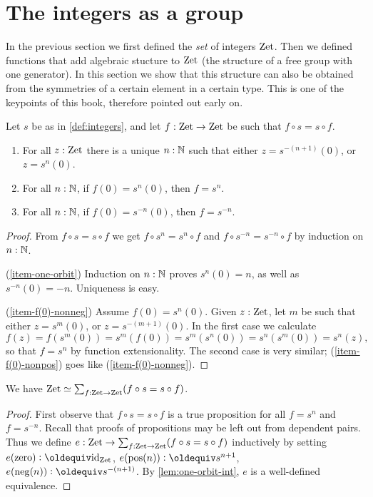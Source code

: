 \documentclass[a4,12pt]{amsart}
\begin{document}
\section{The integers as a group}
\label{sec:integers-group}

In the previous section we first defined the \emph{set}
of integers $\mathrm{Zet}$. Then we defined functions that add
algebraic stucture to $\mathrm{Zet}$ (the structure of a free group 
with one generator). In this section we
show that this structure can also be obtained from the
symmetries of a certain element in a certain type.
This is one of the keypoints of this book, 
therefore pointed out early on.

\begin{lemma}\label{lem:one-orbit-int}
Let $s$ be as in \cref{def:integers}, and 
let $f:\mathrm{Zet}\to\mathrm{Zet}$ be such that $f\circ s = s\circ f$. 
  \begin{enumerate}
  \item\label{item-one-orbit} For all $z:\mathrm{Zet}$ there is a unique $n:\mathbb{N}$
such that either $z=s^{-(n+1)}(0)$, or $z=s^{n}(0)$.
  \item\label{item-f(0)-nonneg} For all $n:\mathbb{N}$, if $f(0)=s^{n}(0)$, then $f=s^{n}$.
  \item\label{item-f(0)-nonpos} For all $n:\mathbb{N}$, if $f(0)=s^{-n}(0)$, then $f=s^{-n}$.
  \end{enumerate}
\end{lemma}
\begin{proof}
From $f\circ s = s\circ f$ we get $f\circ s^n = s^n\circ f$
and $f\circ s^{-n} = s^{-n}\circ f$ by induction on $n:\mathbb{N}$.

(\ref{item-one-orbit}) Induction on $n:\mathbb{N}$ proves $s^{n}(0)=n$, 
as well as $s^{-n}(0)=-n$. Uniqueness is easy.

(\ref{item-f(0)-nonneg}) Assume $f(0)=s^{n}(0)$.  
Given $z:\mathrm{Zet}$, let $m$ be such that either $z=s^{m}(0)$, 
or $z=s^{-(m+1)}(0)$. In the first case we calculate
\[
f(z)=f(s^{m}(0))=s^{m}(f(0))=s^{m}(s^{n}(0))=s^{n}(s^{m}(0))= s^{n}(z),
\]
so that $f=s^{n}$ by function extensionality. 
The second case is very similar;
(\ref{item-f(0)-nonpos}) goes like (\ref{item-f(0)-nonneg}).
\end{proof}

\begin{corollary}\label{cor:pre-torsor-int}
We have $\mathrm{Zet}\simeq \sum_{f:\mathrm{Zet}\to\mathrm{Zet}} (f\circ s = s\circ f)$.
\end{corollary}
\begin{proof}
First observe that $f\circ s = s\circ f$ is a true proposition
for all $f=s^n$ and $f=s^{-n}$. Recall that proofs of propositions
may be left out from dependent pairs. Thus we
define $e : \mathrm{Zet}\to \sum_{f:\mathrm{Zet}\to\mathrm{Zet}} (f\circ s = s\circ f)$ 
inductively by setting 
$e(\zzero)\defeq \id_\zet$, 
$e(\zpos(n))\defeq s^{n+1}$,
$e(\zneg(n))\defeq s^{-(n+1)}$.
By \cref{lem:one-orbit-int}, $e$ is a well-defined equivalence.
\end{proof}
\end{document}
